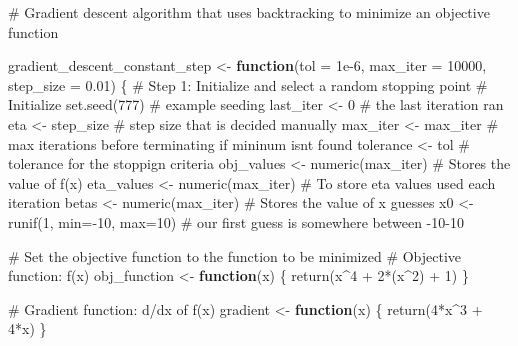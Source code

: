 \documentclass[
  letterpaper,
  DIV=11,
  numbers=noendperiod]{scrartcl}
\newenvironment{Shaded}{\begin{snugshade}}{\end{snugshade}}
\newcommand{\AttributeTok}[1]{\textcolor[rgb]{0.40,0.45,0.13}{#1}}
\newcommand{\CommentTok}[1]{\textcolor[rgb]{0.37,0.37,0.37}{#1}}
\newcommand{\ControlFlowTok}[1]{\textcolor[rgb]{0.00,0.23,0.31}{\textbf{#1}}}
\newcommand{\DecValTok}[1]{\textcolor[rgb]{0.68,0.00,0.00}{#1}}
\newcommand{\FloatTok}[1]{\textcolor[rgb]{0.68,0.00,0.00}{#1}}
\newcommand{\FunctionTok}[1]{\textcolor[rgb]{0.28,0.35,0.67}{#1}}
\newcommand{\NormalTok}[1]{\textcolor[rgb]{0.00,0.23,0.31}{#1}}
\newcommand{\OtherTok}[1]{\textcolor[rgb]{0.00,0.23,0.31}{#1}}
\newcommand{\SpecialCharTok}[1]{\textcolor[rgb]{0.37,0.37,0.37}{#1}}
\begin{document}
\begin{Shaded}
\begin{Highlighting}[]
\CommentTok{\# Gradient descent algorithm that uses backtracking to minimize an objective function}

\NormalTok{gradient\_descent\_constant\_step }\OtherTok{\textless{}{-}} \ControlFlowTok{function}\NormalTok{(}\AttributeTok{tol =} \FloatTok{1e{-}6}\NormalTok{, }\AttributeTok{max\_iter =} \DecValTok{10000}\NormalTok{, }\AttributeTok{step\_size =} \FloatTok{0.01}\NormalTok{) \{}
  \CommentTok{\# Step 1: Initialize and select a random stopping point}
  \CommentTok{\# Initialize}
  \FunctionTok{set.seed}\NormalTok{(}\DecValTok{777}\NormalTok{) }\CommentTok{\# example seeding }
\NormalTok{  last\_iter }\OtherTok{\textless{}{-}} \DecValTok{0} \CommentTok{\# the last iteration ran}
\NormalTok{  eta }\OtherTok{\textless{}{-}}\NormalTok{ step\_size }\CommentTok{\# step size that is decided manually }
\NormalTok{  max\_iter }\OtherTok{\textless{}{-}}\NormalTok{ max\_iter }\CommentTok{\# max iterations before terminating if mininum isn\textquotesingle{}t found}
\NormalTok{  tolerance }\OtherTok{\textless{}{-}}\NormalTok{ tol }\CommentTok{\# tolerance for the stoppign criteria }
\NormalTok{  obj\_values }\OtherTok{\textless{}{-}} \FunctionTok{numeric}\NormalTok{(max\_iter) }\CommentTok{\# Stores the value of f(x)}
\NormalTok{  eta\_values }\OtherTok{\textless{}{-}} \FunctionTok{numeric}\NormalTok{(max\_iter)  }\CommentTok{\# To store eta values used each iteration}
\NormalTok{  betas }\OtherTok{\textless{}{-}} \FunctionTok{numeric}\NormalTok{(max\_iter) }\CommentTok{\# Stores the value of x guesses}
\NormalTok{  x0 }\OtherTok{\textless{}{-}} \FunctionTok{runif}\NormalTok{(}\DecValTok{1}\NormalTok{, }\AttributeTok{min=}\SpecialCharTok{{-}}\DecValTok{10}\NormalTok{, }\AttributeTok{max=}\DecValTok{10}\NormalTok{) }\CommentTok{\# our first guess is somewhere between {-}10{-}10}
  
  \CommentTok{\# Set the objective function to the function to be minimized }
  \CommentTok{\# Objective function: f(x)}
\NormalTok{  obj\_function }\OtherTok{\textless{}{-}} \ControlFlowTok{function}\NormalTok{(x) \{}
    \FunctionTok{return}\NormalTok{(x}\SpecialCharTok{\^{}}\DecValTok{4} \SpecialCharTok{+} \DecValTok{2}\SpecialCharTok{*}\NormalTok{(x}\SpecialCharTok{\^{}}\DecValTok{2}\NormalTok{) }\SpecialCharTok{+} \DecValTok{1}\NormalTok{) }
\NormalTok{  \}}
  
  \CommentTok{\# Gradient function: d/dx of f(x)}
\NormalTok{  gradient }\OtherTok{\textless{}{-}} \ControlFlowTok{function}\NormalTok{(x) \{}
    \FunctionTok{return}\NormalTok{(}\DecValTok{4}\SpecialCharTok{*}\NormalTok{x}\SpecialCharTok{\^{}}\DecValTok{3} \SpecialCharTok{+} \DecValTok{4}\SpecialCharTok{*}\NormalTok{x)}
\NormalTok{  \}}
  

\end{Highlighting}
\end{Shaded}
\end{document}
